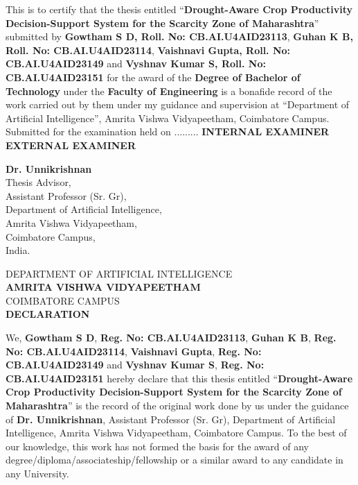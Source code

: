 \documentclass[a4paper, 12pt]{report}
\renewcommand{\_}{\textunderscore\allowbreak}
\theoremstyle{definition}
\newcommand{\thesistitle}{Drought-Aware Crop Productivity Decision-Support System for the Scarcity Zone of Maharashtra}
\begin{document}
	\vspace*{.8cm}
	\noindent This is to certify that the thesis entitled \enquote{\textbf{\thesistitle}} submitted by \textbf{Gowtham S D, Roll. No: CB.AI.U4AID23113}, \textbf{Guhan K B, Roll. No: CB.AI.U4AID23114}, \textbf{Vaishnavi Gupta, Roll. No: CB.AI.U4AID23149} and \textbf{Vyshnav Kumar S, Roll. No: CB.AI.U4AID23151} for the award of the \textbf{Degree of Bachelor of Technology} under the \textbf{Faculty of Engineering} is a bonafide record of the work carried out by them under my guidance and supervision at \enquote{Department of Artificial Intelligence}, Amrita Vishwa Vidyapeetham, Coimbatore Campus.\\
    \vfill
    Submitted for the examination held on .........
    \vfill
    \textbf{INTERNAL EXAMINER}    \hspace{5cm}      \textbf{EXTERNAL EXAMINER}
    \vfill
\begin{center}
		\textbf{Dr. Unnikrishnan}\\
	Thesis Advisor,\\
	Assistant Professor (Sr. Gr),\\
	Department of Artificial Intelligence,\\
	Amrita Vishwa Vidyapeetham,\\
	Coimbatore Campus,\\
	India.
\end{center}

	\newpage
	\begin{center}
	{\large DEPARTMENT OF ARTIFICIAL INTELLIGENCE}\\
	\Large{ \textbf{AMRITA VISHWA VIDYAPEETHAM}}\\

	{\large COIMBATORE CAMPUS}\\


		\vspace*{2.5cm}
		\large {\textbf{DECLARATION}}
		\vspace*{.3cm}
	\end{center}

	\noindent We, \textbf{Gowtham S D}, \textbf{Reg. No: CB.AI.U4AID23113}, \textbf{Guhan K B}, \textbf{Reg. No: CB.AI.U4AID23114}, \textbf{Vaishnavi Gupta}, \textbf{Reg. No: CB.AI.U4AID23149} and \textbf{Vyshnav Kumar S}, \textbf{Reg. No: CB.AI.U4AID23151} hereby declare that this thesis entitled \enquote{\textbf{\thesistitle}} is the record of the original work done by us under the guidance of \textbf{Dr. Unnikrishnan}, Assistant Professor (Sr. Gr), Department of Artificial Intelligence, Amrita Vishwa Vidyapeetham, Coimbatore Campus. To the best of our knowledge, this work has not formed the basis for the award of any degree/diploma/associateship/fellowship or a similar award to any candidate in any University.\\\\
\end{document}
